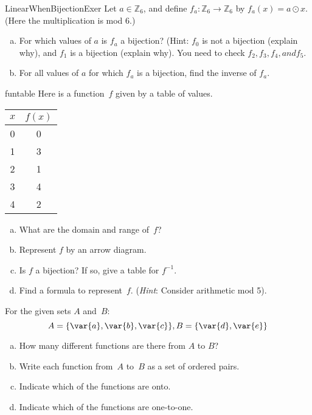 \begin{exercise}{LinearWhenBijectionExer}
Let $a \in \mathbb{Z}_6$, and define $f_a \colon \mathbb{Z}_6 \to \mathbb{Z}_6$ by $f_a(x) = a \odot x$.  (Here the multiplication is mod 6.) 
\begin{enumerate}[(a)]
\item \label{LinearWhenBijectionExer-not0}
For which values of $a$  is $f_a$ a bijection? (Hint: $f_0$ is not a bijection (explain why), and $f_1$ is a bijection (explain why).  You need to check $f_2, f_3, f_4, and f_5$.
\item \label{LinearWhenBijectionExer-0}
For all values of $a$ for which $f_a$ is a bijection, find the inverse of $f_a$.
\end{enumerate}
\end{exercise}


\begin{exercise}{funtable}
Here is a function~$f$ given by a table of values.

\begin{center}
\begin{tabular}{c|c}
$x$ & $f(x)$ \\ \hline

0 & 0 \\
1 & 3 \\
2 & 1 \\
3 & 4 \\
4 & 2 \\
\end{tabular}
\end{center}

\begin{enumerate}[(a)]
\item  \label{FunctionByTableEx-domain}
What are the domain and range  of~$f$?
\item  \label{FunctionByTableEx-pairs}
Represent $f$ by an arrow diagram.
\item
Is $f$ a bijection? If so, give a table for $f^{-1}$.
\item  \label{FunctionByTableEx-formula}
Find a formula to represent~$f$. (\emph{Hint}:  Consider arithmetic mod 5).
\end{enumerate}
\end{exercise}


\begin{exercise}{27}
 For the given sets $A$ and~$B$:
\[ A = \{\var{a},\var{b},\var{c}\}, B = \{\var{d},\var{e}\} \]
\begin{enumerate}[(a)] 
\item How many different functions are there from $A$ to $B$?
\item Write each function from~$A$ to~$B$ as a set of ordered pairs. 
\item  Indicate which of the functions are onto.
\item Indicate which of the functions are one-to-one.
\end{enumerate}
\end{exercise}

